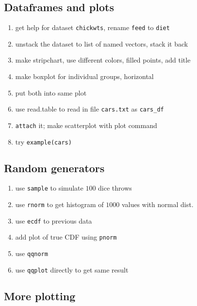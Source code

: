 \documentclass[4pt]{article}
\begin{document}
\subsection{Dataframes and plots}
\begin{enumerate}
 \item get help for dataset \verb'chickwts', rename \verb'feed' to \verb'diet'
 \item unstack the dataset to list of named vectors, stack it back
 \item make stripchart, use different colors, filled points, add title
 \item make boxplot for individual groups, horizontal
 \item put both into same plot
 \item use read.table to read in file \verb'cars.txt' as \verb'cars_df'
 \item \verb'attach' it; make scatterplot with plot command
 \item try \verb'example(cars)'
\end{enumerate}

\subsection{Random generators}
\begin{enumerate}
 \item use \verb'sample' to simulate $100$ dice throws
 \item use \verb'rnorm' to get histogram of $1000$ values with normal dist.
 \item use \verb'ecdf' to previous data 
 \item add plot of true CDF using \verb'pnorm'
 \item use \verb'qqnorm'
 \item use \verb'qqplot' directly to get same result
\end{enumerate}
\pagebreak

\subsection{More plotting}
\end{document}
